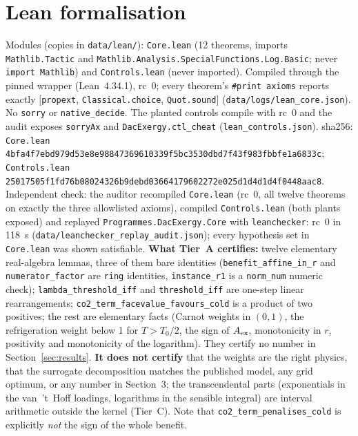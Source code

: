 \documentclass[10pt]{article}
\newcommand{\lean}[1]{\texttt{#1}}
\begin{document}
\section{Lean formalisation}\label{sec:lean}
Modules  (copies in \texttt{data/lean/}): \texttt{Core.lean} (12 theorems, imports \lean{Mathlib.Tactic} and \lean{Mathlib.Analysis.SpecialFunctions.Log.Basic}; never \lean{import Mathlib}) and \texttt{Controls.lean} (never imported). Compiled through the pinned wrapper (Lean~4.34.1), rc~0; every theorem's \lean{\#print axioms} reports exactly
$[$\lean{propext}, \lean{Classical.choice}, \lean{Quot.sound}$]$ (\texttt{data/logs/lean\_core.json}). No \lean{sorry} or \lean{native\_decide}. The planted controls compile with rc~0 and the audit exposes \lean{sorryAx} and \lean{DacExergy.ctl\_cheat} (\texttt{lean\_controls.json}).
sha256: \texttt{Core.lean} \texttt{4bfa4f7ebd979d53e8e98847369610339f5bc3530dbd7f43f983fbbfe1a6833c}; \texttt{Controls.lean} \texttt{25017505f1fd76b08024326b9debd03664179602272e025d1d4d1d4f0448aac8}.
Independent check: the auditor recompiled \texttt{Core.lean} (rc~0, all twelve theorems on exactly the three allowlisted axioms), compiled \texttt{Controls.lean} (both plants exposed) and replayed \texttt{Programmes.DacExergy.Core} with \texttt{leanchecker}: rc~0 in 118~s (\texttt{data/leanchecker\_replay\_audit.json}); every hypothesis set in \texttt{Core.lean} was shown satisfiable.
\textbf{What Tier~A certifies:} twelve elementary real-algebra lemmas, three of them bare identities (\lean{benefit\_affine\_in\_r} and \lean{numerator\_factor} are \lean{ring} identities, \lean{instance\_r1} is a \lean{norm\_num} numeric check); \lean{lambda\_threshold\_iff} and \lean{threshold\_iff} are one-step linear rearrangements; \lean{co2\_term\_facevalue\_favours\_cold} is a product of two positives; the rest are elementary facts (Carnot weights in $(0,1)$, the refrigeration weight below 1 for $T>T_0/2$, the sign of $A_{\rm ex}$, monotonicity in $r$, positivity and monotonicity of the logarithm). They certify no number in Section~\ref{sec:results}. \textbf{It does not certify} that the weights are the right physics, that the surrogate decomposition matches the published model, any grid optimum, or any number in Section~3; the transcendental parts (exponentials in the van~'t~Hoff loadings, logarithms in the sensible integral) are interval arithmetic outside the kernel (Tier~C). Note that \lean{co2\_term\_penalises\_cold} is explicitly \emph{not} the sign of the whole benefit.
\end{document}

